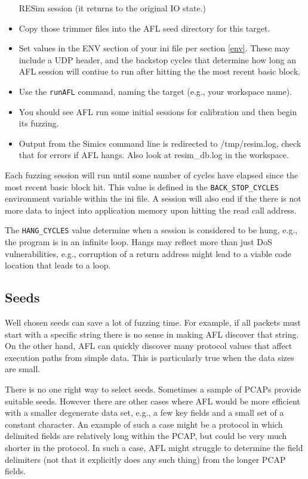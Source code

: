 \documentclass[titlepage]{article}
\begin{document}
\begin{itemize}
RESim session (it returns to the original IO state.) 
\item Copy those trimmer files into the AFL seed directory for this target.
\item Set values in the ENV section of your ini file per section \ref{env}.  These may include a UDP header, and the 
backstop cycles that determine how long an AFL session will contiue to run after hitting the the most recent basic block. 
\item Use the {\tt runAFL} command, naming the target (e.g., your workspace name).
\item You should see AFL run some initial sessions for calibration and then begin its fuzzing.
\item Output from the Simics command line is redirected to /tmp/resim.log, check that for errors if AFL hangs.  Also look at resim\_db.log
in the workspace.
\end{itemize}

Each fuzzing session will run until some number of cycles have elapsed since the most recent basic block hit.  This
value is defined in the {\tt BACK\_STOP\_CYCLES} environment variable within the ini file.  A session will also end
if the there is not more data to inject into application memory upon hitting the read call address.

The {\tt HANG\_CYCLES} value determine when a session is considered to be hung, e.g., the program is in an infinite loop.
Hangs may reflect more than just DoS vulnerabilities, e.g., corruption of a return address might lead to a viable code location
that leads to a loop.

\subsection{Seeds}
Well chosen seeds can save a lot of fuzzing time.  For example, if all packets must start with a specific string there is no sense in
making AFL discover that string.  On the other hand, AFL can quickly discover many protocol values that affect execution paths from simple
data.  This is particularly true when the data sizes are small.  

There is no one right way to select seeds.  Sometimes a sample of PCAPs provide suitable seeds.  However there are other cases where AFL would
be more efficient with a smaller degenerate data set, e.g., a few key fields and a small set of a constant character.  An example of such a case
might be a protocol in which delimited fields are relatively long within the PCAP, but could be very much shorter in the protocol.  In such a case,
AFL might struggle to determine the field delimiters (not that it explicitly does any such thing) from the longer PCAP fields.
\end{document}
